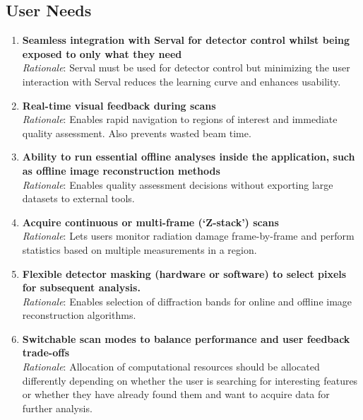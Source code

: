 \documentclass[10pt]{article}
\begin{document}
\subsection{User Needs}
\begin{enumerate}
  \item \textbf{Seamless integration with Serval for detector control whilst being exposed to only what they need}\\
        \textit{Rationale}: Serval must be used for detector control but minimizing the user interaction with Serval reduces the learning curve and enhances usability.
  \item \textbf{Real-time visual feedback during scans}\\
        \textit{Rationale}: Enables rapid navigation to regions of interest and immediate quality assessment. Also prevents wasted beam time.
  \item \textbf{Ability to run essential offline analyses inside the application, such as offline image reconstruction methods}\\
        \textit{Rationale}: Enables quality assessment decisions without exporting large datasets to external tools.
  \item \textbf{Acquire continuous or multi-frame (`Z-stack') scans}\\
        \textit{Rationale}: Lets users monitor radiation damage frame-by-frame and perform statistics based on multiple measurements in a region.
  \item \textbf{Flexible detector masking (hardware or software) to select pixels for subsequent analysis.}\\
        \textit{Rationale}: Enables selection of diffraction bands for online and offline image reconstruction algorithms.
  \item \textbf{Switchable scan modes to balance performance and user feedback trade-offs}\\
        \textit{Rationale}: Allocation of computational resources should be allocated differently depending on whether the user is searching for interesting features or whether they have already found them and want to acquire data for further analysis.

\end{enumerate}
\end{document}
